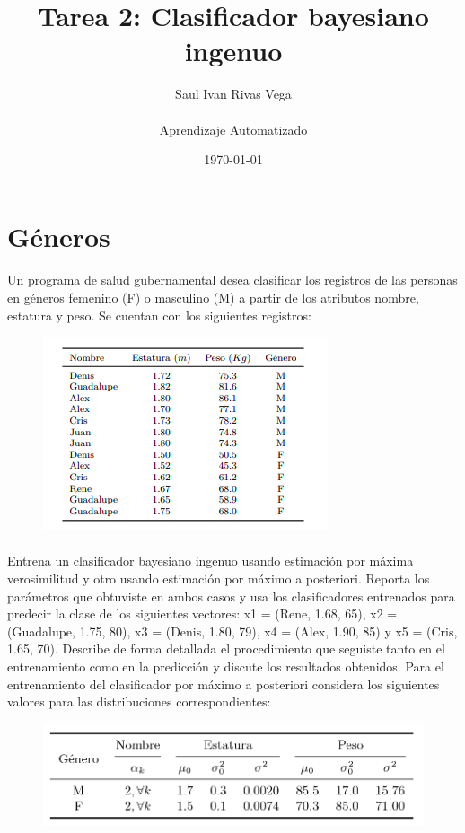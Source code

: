 \documentclass[12pt]{article}
\title{Tarea 2: Clasificador bayesiano ingenuo}
\author{
	Saul Ivan Rivas Vega \\
	\\
	Aprendizaje Automatizado\\
}
\date{\today}
\begin{document}
	\maketitle
	\pagebreak
	\section{Géneros}
	  \paragraph{} Un programa de salud gubernamental desea clasificar los registros de las personas en géneros femenino (F) o masculino (M) a partir de los atributos nombre, estatura y peso. Se cuentan con los
	  siguientes registros:\\
	  \begin{figure}[h!]
	  	\centering
	  	\includegraphics[width=.6\linewidth]{excercise1}
	  	\label{fig1}
	  \end{figure}
  \paragraph{} Entrena un clasificador bayesiano ingenuo usando estimación por máxima verosimilitud y otro usando estimación por máximo a posteriori. Reporta los parámetros que obtuviste en ambos casos y usa los clasificadores entrenados para predecir la clase de los siguientes vectores: x1 = (Rene, 1.68, 65), x2 = (Guadalupe, 1.75, 80), x3 = (Denis, 1.80, 79), x4 = (Alex, 1.90, 85) y x5 = (Cris, 1.65, 70).
  Describe de forma detallada el procedimiento que seguiste tanto en el entrenamiento como en la predicción y discute los resultados obtenidos.
  Para el entrenamiento del clasificador por máximo a posteriori considera los siguientes valores
  para las distribuciones correspondientes:
	  \begin{figure}[h!]
	  	\centering
	  	\includegraphics[width=.6\linewidth]{ex1_002}
	  	\label{fig2}
	  \end{figure}
  \clearpage
  \pagebreak
\end{document}
